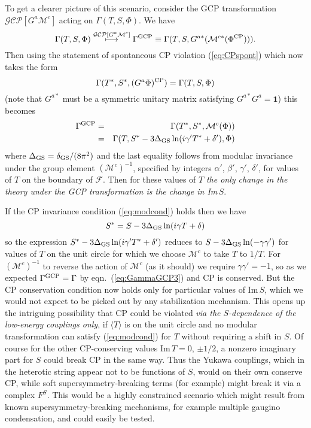 \documentclass[a4paper,12pt]{article}
\begin{document}
To get a clearer picture of this scenario, consider the GCP transformation $\mathcal{GCP}[G^{a}\mathcal{M}^c]$ acting on $\Gamma(T,S,\Phi)$. We have 
\begin{equation}
	\Gamma(T,S,\Phi)\stackrel{\mathcal{GCP}[G^{a}\mathcal{M}^c]}{\longmapsto} \Gamma^{\rm GCP} \equiv \Gamma(T,S,G^{a*}(\mathcal{M}^{c*}(\Phi^{\rm CP}))).
\end{equation}
Then using the statement of spontaneous CP violation (\ref{eq:CPspont}) which now takes the form
\[ \Gamma(T^*,S^*,(G^{a}\Phi)^{\rm CP}) = \Gamma(T,S,\Phi) \]
(note that $G^{a*}$ must be a symmetric unitary matrix satisfying $G^{a*}G^a=\mathbf{1}$) this becomes
\begin{eqnarray}
	\Gamma^{\rm GCP} &=& \Gamma(T^*,S^*,\mathcal{M}^{c}(\Phi)) \\
	&=& \Gamma(T,S^*-3\Delta_{\rm GS}\ln(i\gamma'T^*+\delta'),\Phi)
	\label{eq:GammaGCP3}
\end{eqnarray}
where $\Delta_{\rm GS}=\delta_{\rm GS}/(8\pi^2)$ and the last equality follows from modular invariance under the group element $(\mathcal{M}^{c})^{-1}$, specified by integers $\alpha'$, $\beta'$, $\gamma'$, $\delta'$, for values of $T$ on the boundary of $\mathcal{F}$. Then for these values of $T$ {\em the only change in the theory under the GCP transformation is the change in Im}\/$\,S$. 

If the CP invariance condition (\ref{eq:modcond}) holds then we have
\[ S^*=S-3\Delta_{\rm GS}\ln(i\gamma T+\delta) \] 
so the expression $S^*-3\Delta_{\rm GS}\ln(i\gamma'T^*+\delta')$ reduces to $S-3\Delta_{\rm GS}\ln(-\gamma\gamma')$ for values of $T$ on the unit circle for which we choose $\mathcal{M}^c$ to take $T$ to $1/T$. For $(\mathcal{M}^c)^{-1}$ to reverse the action of $\mathcal{M}^c$ (as it should) we require $\gamma\gamma'=-1$, so as we expected $\Gamma^{\rm GCP}=\Gamma$ by eqn.\ (\ref{eq:GammaGCP3}) and CP is conserved. But the CP conservation condition now holds only for particular values of Im$\,S$, which we would not expect to be picked out by any stabilization mechanism. This opens up the intriguing possibility that CP could be violated {\em via the $S$-dependence of the low-energy couplings only}, if $\langle T\rangle$ is on the unit circle and no modular transformation can satisfy (\ref{eq:modcond}) for $T$ without requiring a shift in $S$. Of course for the other CP-conserving values Im$\,T=0$, $\pm 1/2$, a nonzero imaginary part for $S$ could break CP in the same way. Thus the Yukawa couplings, which in the heterotic string appear not to be functions of $S$, would on their own conserve CP, while soft supersymmetry-breaking terms (for example) might break it via a complex $F^S$. This would be a highly constrained scenario which might result from known supersymmetry-breaking mechanisms, for example multiple gaugino condensation, and could easily be tested.
   
\end{document}
